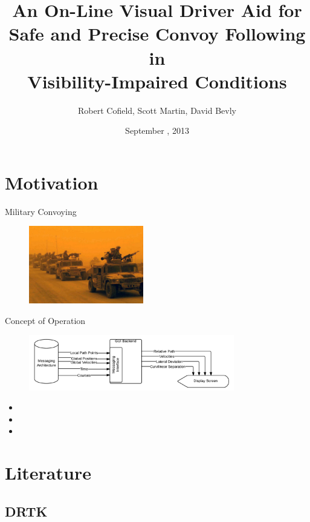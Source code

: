 \documentclass{beamer}
\title[DRTK Driver Assistance]{An On-Line Visual Driver Aid for\\ Safe and Precise Convoy Following in\\ Visibility-Impaired Conditions}
\author[]{Robert Cofield, Scott Martin, David Bevly}
\date{September , 2013}
\begin{document}
\frame{\titlepage}


\section{Motivation}

  \begin{frame}{Military Convoying}
    \begin{figure}
      \includegraphics[width=5cm]{../graphics/convoy_sandstorm_orange.jpg}
      \caption{\cite{convoy_dust_orange}}
    \end{figure}
  \end{frame} 

  \begin{frame}{Concept of Operation}

    \begin{figure}
      \includegraphics[width=0.8\textwidth]{../graphics/blackbox_flowchart.png}
    \end{figure}
    \begin{itemize}
      \item
      \item
      \item
    \end{itemize}
  \end{frame}



\section{Literature}

  \subsection{DRTK}
\end{document}
